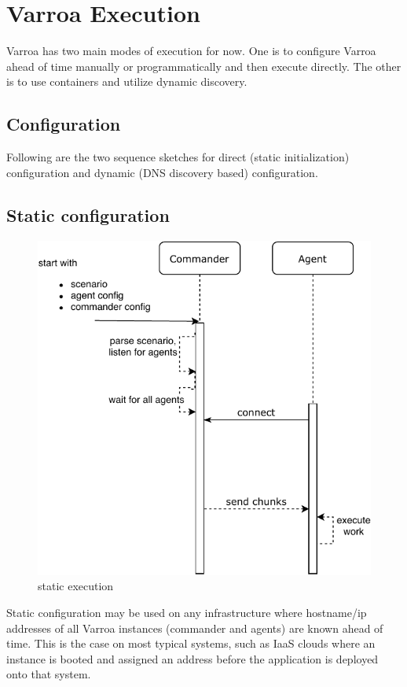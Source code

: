 \chapter{Varroa Execution}

Varroa has two main modes of execution for now. One is to configure Varroa ahead of time manually or programmatically and then execute directly. The other is to use containers and utilize dynamic discovery.

\section{Configuration}
Following are the two sequence sketches for direct (static initialization) configuration and dynamic (DNS discovery based) configuration.

\section{Static configuration}
\begin{figure}[h]
\begin{center}
\includegraphics[scale=0.65]{Resources/PDF/ExecutionStaticInit}
\caption{static execution}
\end{center}
\end{figure}

Static configuration may be used on any infrastructure where hostname/ip addresses of all Varroa instances (commander and agents) are known ahead of time. This is the case on most typical systems, such as IaaS clouds where an instance is booted and assigned an address before the application is deployed onto that system.

